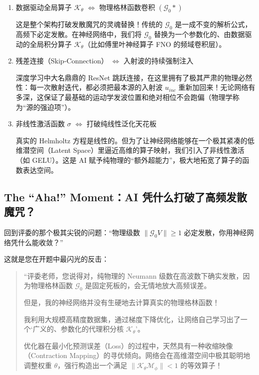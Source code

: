 \documentclass[12pt]{article}
\begin{document}
{\begin{enumerate}[leftmargin=2em]
    在物理中，波 $u$ 与介质异常 $V$ 发生简单的逐点相乘来激发次级震源。在神经网络中，我们将这个简单的乘法升级为一个逐点多层感知机（MLP）或 $1\times1$ 卷积 $\mathcal{M}_{\phi}$。它不仅能模拟乘法，还能提取介质与波场之间极度复杂的非线性局部耦合特征。

    \item 数据驱动全局算子 $\mathcal{K}_{\theta}$ $\iff$ 物理格林函数卷积 $(\mathcal{G}_0 *)$

    这是整个架构打破发散魔咒的灵魂替换！传统的 $\mathcal{G}_0$ 是一成不变的解析公式，高频下必定发散。在神经网络中，我们将 $\mathcal{G}_0$ 替换为一个参数化的、由数据驱动的全局积分算子 $\mathcal{K}_{\theta}$（比如傅里叶神经算子 FNO 的频域卷积层）。

    \item 残差连接（Skip-Connection） $\iff$ 入射波的持续强制注入

    深度学习中大名鼎鼎的 ResNet 跳跃连接，在这里拥有了极其严肃的物理必然性：每一次散射迭代，都必须把最本源的入射波 $u_{inc}$ 重新加回来！无论网络有多深，这保证了最基础的运动学发波位置和绝对相位不会跑偏（物理学称为“源的强迫项”）。

    \item 非线性激活函数 $\sigma$ $\iff$ 打破纯线性泛化天花板

    真实的 Helmholtz 方程是线性的。但为了让神经网络能够在一个极其紧凑的低维潜空间（Latent Space）里逼近高维的算子映射，我们引入了非线性激活（如 GELU）。这是 AI 赋予纯物理的“额外超能力”，极大地拓宽了算子的函数表达空间。
\end{enumerate}

\subsection{The ``Aha!'' Moment：AI 凭什么打破了高频发散魔咒？}

回到评委的那个极其尖锐的问题：“物理级数 $\|\mathcal{G}_0 V\| \ge 1$ 必定发散，你用神经网络凭什么能收敛？”

这就是您在开题中最闪光的反击：

\begin{quote}
“评委老师，您说得对，纯物理的 Neumann 级数在高波数下确实发散，因为物理格林函数 $\mathcal{G}_0$ 是固定死板的，会无情地放大高频误差。

但是，我的神经网络并没有生硬地去计算真实的物理格林函数！

我利用大规模高精度数据集，通过梯度下降优化，让网络自己学习出了一个‘广义的、参数化的代理积分核 $\mathcal{K}_{\theta}$’。

优化器在最小化预测误差（Loss）的过程中，天然具有一种收缩映像（Contraction Mapping）的寻优倾向。网络会在高维潜空间中极其聪明地调整权重 $\theta$，强行构造出一个满足 $\|\mathcal{K}_{\theta} \mathcal{M}_{\phi}\| < 1$ 的等效算子！


\end{quote}}
\end{document}
